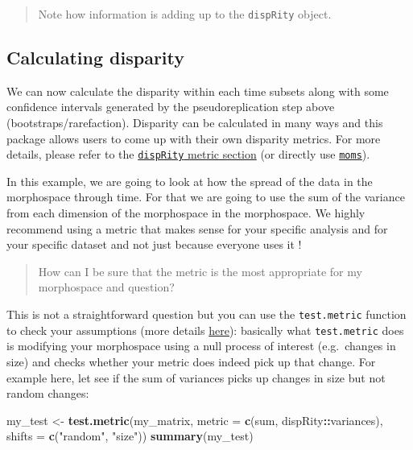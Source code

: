 \documentclass[
]{book}
\newenvironment{Shaded}{\begin{snugshade}}{\end{snugshade}}
\newcommand{\DataTypeTok}[1]{\textcolor[rgb]{0.13,0.29,0.53}{#1}}
\newcommand{\KeywordTok}[1]{\textcolor[rgb]{0.13,0.29,0.53}{\textbf{#1}}}
\newcommand{\NormalTok}[1]{#1}
\newcommand{\OperatorTok}[1]{\textcolor[rgb]{0.81,0.36,0.00}{\textbf{#1}}}
\newcommand{\StringTok}[1]{\textcolor[rgb]{0.31,0.60,0.02}{#1}}
\begin{document}
\begin{quote}
Note how information is adding up to the \texttt{dispRity} object.
\end{quote}

\hypertarget{calculating-disparity-1}{%
\subsection{Calculating disparity}\label{calculating-disparity-1}}

We can now calculate the disparity within each time subsets along with some confidence intervals generated by the pseudoreplication step above (bootstraps/rarefaction).
Disparity can be calculated in many ways and this package allows users to come up with their own disparity metrics.
For more details, please refer to the \protect\hyperlink{disparity-metrics}{\texttt{dispRity} metric section} (or directly use \href{https://tguillerme.shinyapps.io/moms/}{\texttt{moms}}).

In this example, we are going to look at how the spread of the data in the morphospace through time.
For that we are going to use the sum of the variance from each dimension of the morphospace in the morphospace.
We highly recommend using a metric that makes sense for your specific analysis and for your specific dataset and not just because everyone uses it \citep[\citet{Guillerme2020}]{moms}!

\begin{quote}
How can I be sure that the metric is the most appropriate for my morphospace and question?
\end{quote}

This is not a straightforward question but you can use the \texttt{test.metric} function to check your assumptions (more details \protect\hyperlink{disparity-metrics}{here}): basically what \texttt{test.metric} does is modifying your morphospace using a null process of interest (e.g.~changes in size) and checks whether your metric does indeed pick up that change.
For example here, let see if the sum of variances picks up changes in size but not random changes:

\begin{Shaded}
\begin{Highlighting}[]
\NormalTok{my\_test \textless{}{-}}\StringTok{ }\KeywordTok{test.metric}\NormalTok{(my\_matrix, }\DataTypeTok{metric =} \KeywordTok{c}\NormalTok{(sum, dispRity}\OperatorTok{::}\NormalTok{variances), }\DataTypeTok{shifts =} \KeywordTok{c}\NormalTok{(}\StringTok{"random"}\NormalTok{, }\StringTok{"size"}\NormalTok{))}
\KeywordTok{summary}\NormalTok{(my\_test)}
\end{Highlighting}
\end{Shaded}
\end{document}
